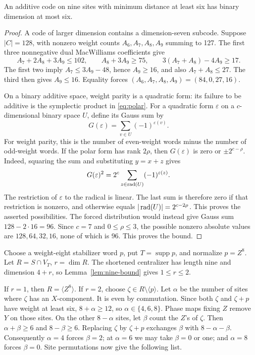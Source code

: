 \begin{lemma}\label{lem:nine-bound}
An additive code on nine sites with minimum distance at least six has
binary dimension at most six.
\end{lemma}
\begin{proof}
A code of larger dimension contains a dimension-seven subcode. Suppose
\(|C|=128\), with nonzero weight counts \(A_6,A_7,A_8,A_9\) summing to
127. The first three nonnegative dual MacWilliams coefficients give
\[
 A_7+2A_8+3A_9\leq102,\qquad
 A_8+3A_9\geq75,\qquad
 3(A_7+A_8)-4A_9\geq17.
\]
The first two imply \(A_7\leq3A_9-48\), hence \(A_9\geq16\), and
also \(A_7+A_8\leq27\). The third then gives \(A_9\leq16\).
Equality forces
\((A_6,A_7,A_8,A_9)=(84,0,27,16)\).

On a binary additive space, weight parity is a quadratic form: its failure
to be additive is the symplectic product in \eqref{eq:polar}.
For a quadratic form \(\varepsilon\) on a \(c\)-dimensional binary space \(U\),
define its Gauss sum by
\[
 G(\varepsilon)=\sum_{v\in U}(-1)^{\varepsilon(v)}.
\]
For weight parity, this is the number of even-weight words minus the
number of odd-weight words. If the polar form has rank \(2\rho\), then
\(G(\varepsilon)\) is zero or \(\pm2^{c-\rho}\). Indeed, squaring the sum and
substituting \(y=x+z\) gives
\[
 G(\varepsilon)^2=2^c\sum_{z\in\operatorname{rad}(U)}(-1)^{\varepsilon(z)}.
\]
The restriction of \(\varepsilon\) to the radical is linear. The last sum is
therefore zero if that restriction is nonzero, and otherwise equals
\(|\operatorname{rad}(U)|=2^{c-2\rho}\). This proves the asserted possibilities.
The forced distribution would instead give Gauss sum
\(128-2\cdot16=96\). Since \(c=7\) and \(0\leq\rho\leq3\),
the possible nonzero absolute values are \(128,64,32,16\), none of
which is 96. This proves the bound.
\end{proof}

Choose a weight-eight stabilizer word \(p\), put \(T=\operatorname{supp}p\),
and normalize \(p=Z^8\). Let \(R=S\cap V_T\), \(r=\dim R\).
The shortened centralizer has length nine and dimension \(4+r\), so
Lemma~\ref{lem:nine-bound} gives \(1\leq r\leq2\).

If \(r=1\), then \(R=\langle Z^8\rangle\).
If \(r=2\), choose \(\zeta\in R\setminus\langle p\rangle\).
Let \(\alpha\) be the number of sites where \(\zeta\) has an \(X\)-component.
It is even by commutation. Since both \(\zeta\) and \(\zeta+p\) have weight
at least six, \(8+\alpha\geq12\), so \(\alpha\in\{4,6,8\}\).
Phase maps fixing \(Z\) remove \(Y\) on those sites. On the other
\(8-\alpha\) sites, let \(\beta\) count the \(Z\)'s of \(\zeta\).
Then \(\alpha+\beta\geq6\) and \(8-\beta\geq6\).
Replacing \(\zeta\) by \(\zeta+p\) exchanges \(\beta\) with \(8-\alpha-\beta\).
Consequently \(\alpha=4\) forces \(\beta=2\); at \(\alpha=6\) we may take
\(\beta=0\) or one; and \(\alpha=8\) forces \(\beta=0\).
Site permutations now give the following list.

